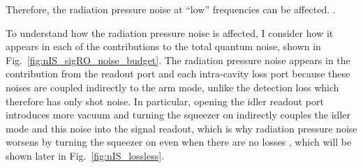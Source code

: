 Therefore, the radiation pressure noise at ``low'' frequencies can be affected. .

To understand how the radiation pressure noise is affected, I consider how it appears in each of the contributions to the total quantum noise, shown in Fig.~\ref{fig:nIS_sigRO_noise_budget}. The radiation pressure noise appears in the contribution from the readout port and each intra-cavity loss port because these noises are coupled indirectly to the arm mode, unlike the detection loss which therefore has only shot noise. In particular, opening the idler readout port introduces more vacuum and turning the squeezer on indirectly couples the idler mode and this noise into the signal readout, which is why radiation pressure noise worsens by turning the squeezer on even when there are no losses , which will be shown later in Fig.~\ref{fig:nIS_lossless}.

